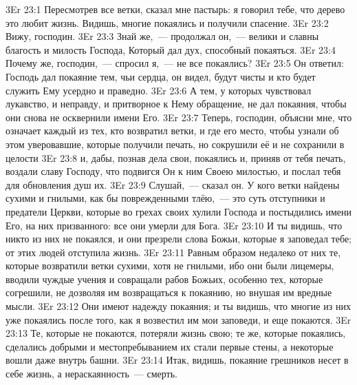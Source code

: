 \vs 3Er 23:1
Пересмотрев все ветки,
сказал мне пастырь: я говорил тебе, что дерево это любит жизнь. Видишь, многие
покаялись и получили спасение.
\vs 3Er 23:2
Вижу, господин.
\vs 3Er 23:3
Знай же,~--- продолжал он,~--- велики и славны благость и милость Господа, Который дал дух, способный
покаяться.
\vs 3Er 23:4
Почему же, господин,~--- спросил я,~--- не все покаялись?
\vs 3Er 23:5
Он ответил: Господь дал
покаяние тем, чьи сердца, он видел, будут чисты и кто будет служить Ему
усердно и праведно.
\vs 3Er 23:6
А тем, у которых
чувствовал лукавство, и неправду, и притворное к Нему обращение, не дал
покаяния, чтобы они снова не осквернили имени Его.
\vs 3Er 23:7
Теперь, господин, объясни
мне, что означает каждый из тех, кто возвратил ветки, и где его место, чтобы
узнали об этом уверовавшие, которые получили печать, но сокрушили её и не
сохранили в целости
\vs 3Er 23:8
и, дабы, познав дела свои,
покаялись и, приняв от тебя печать, воздали славу Господу, что подвигся Он к
ним Своею милостью, и послал тебя для обновления душ их.
\vs 3Er 23:9
Слушай,~--- сказал он. У
кого ветки найдены сухими и гнилыми, как бы поврежденными тлёю,~--- это суть
отступники и предатели Церкви, которые во грехах своих хулили Господа и
постыдились имени Его, на них призванного: все они умерли для Бога.
\vs 3Er 23:10
И ты видишь, что никто из
них не покаялся, и они презрели слова Божьи, которые я заповедал тебе; от этих
людей отступила жизнь.
\vs 3Er 23:11
Равным образом недалеко
от них те, которые возвратили ветки сухими, хотя не гнилыми, ибо они были
лицемеры, вводили чуждые учения и совращали рабов Божьих, особенно тех,
которые согрешили, не дозволяя им возвращаться к покаянию, но внушая им
вредные мысли.
\vs 3Er 23:12
Они имеют надежду
покаяния; и ты видишь, что многие из них уже покаялись после того, как я
возвестил им мои заповеди, и еще покаются.
\vs 3Er 23:13
Те, которые не покаются,
потеряли жизнь свою; те же, которые покаялись, сделались добрыми и
местопребыванием их стали первые стены, а некоторые вошли даже внутрь башни.
\vs 3Er 23:14
Итак, видишь, покаяние
грешников несет в себе жизнь, а нераскаянность~--- смерть.

